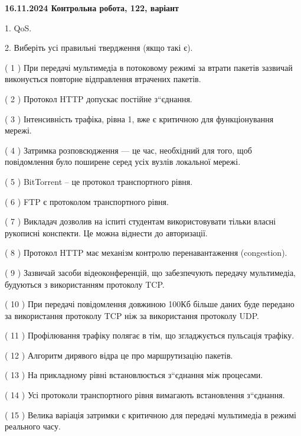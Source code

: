 \documentclass[12pt, ukrainian]{article}
\begin{document}
\vspace{4mm}
\newpage
\begin {large}

\textbf{16.11.2024 Контрольна робота, 122, варіант  }\par


{
1. QoS.



\vspace{5mm}
2. Виберіть усі правильні твердження (якщо такі є).\par
\vspace{2mm}

( 1 ) При передачі мультимедіа в потоковому режимі за втрати пакетів зазвичай виконується повторне відправлення втрачених пакетів.

( 2 ) Протокол  HTTP допускає постійне з“єднання.

( 3 ) Інтенсивність трафіка, рівна 1, вже є критичною для функціонування мережі.

( 4 ) Затримка розповсюдження — це час, необхідний для того, щоб повідомлення було поширене серед усіх вузлів локальної мережі.

( 5 ) BitTorrent – це протокол транспортного рівня.

( 6 ) FTP є протоколом транспортного рівня.

( 7 ) Викладач дозволив на іспиті студентам використовувати тільки власні рукописні конспекти. Це можна віднести до авторизації.

( 8 ) Протокол HTTP має механізм контролю перенавантаження (congestion).

( 9 ) Зазвичай засоби відеоконференцій, що забезпечують передачу мультимедіа, будуються з використанням протоколу TCP.

( 10 ) При передачі повідомлення довжиною 100Кб більше даних буде передано за використання протоколу TCP ніж за використання протоколу UDP.

( 11 ) Профілювання трафіку полягає в тім, що згладжується пульсація трафіку.

( 12 ) Алгоритм дирявого відра це про маршрутизацію пакетів.

( 13 ) На прикладному рівні встановлюється з“єднання між процесами.

( 14 ) Усі протоколи транспортного рівня вимагають встановлення з“єднання.

( 15 ) Велика варіація затримки є критичною для передачі мультимедіа в режимі реального часу.
}
\end {large}
\end{document}
